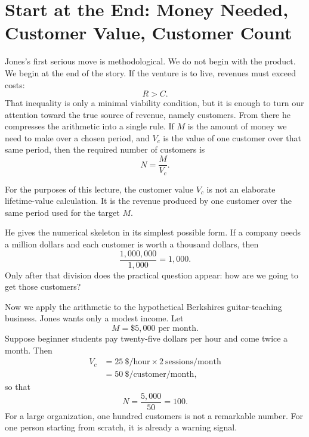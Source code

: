 \section{Start at the End: Money Needed, Customer Value, Customer Count}

Jones's first serious move is methodological. We do not begin with the product. We begin at the end of the story. If the venture is to live, revenues must exceed costs:
\begin{equation}
R>C.
\end{equation}
That inequality is only a minimal viability condition, but it is enough to turn our attention toward the true source of revenue, namely customers. From there he compresses the arithmetic into a single rule. If \(M\) is the amount of money we need to make over a chosen period, and \(V_c\) is the value of one customer over that same period, then the required number of customers is
\begin{equation}
N=\frac{M}{V_c}.
\end{equation}

\begin{definition}
For the purposes of this lecture, the customer value \(V_c\) is not an elaborate lifetime-value calculation. It is the revenue produced by one customer over the same period used for the target \(M\).
\end{definition}

He gives the numerical skeleton in its simplest possible form. If a company needs a million dollars and each customer is worth a thousand dollars, then
\begin{equation}
\frac{1{,}000{,}000}{1{,}000}=1{,}000.
\end{equation}
Only after that division does the practical question appear: how are we going to get those customers?

Now we apply the arithmetic to the hypothetical Berkshires guitar-teaching business. Jones wants only a modest income. Let
\[
M=\$5{,}000 \text{ per month.}
\]
Suppose beginner students pay twenty-five dollars per hour and come twice a month. Then
\begin{align}
V_c &= 25\ \$/\text{hour}\times 2\ \text{sessions/month} \\
&= 50\ \$/\text{customer/month},
\end{align}
so that
\begin{equation}
N=\frac{5{,}000}{50}=100.
\end{equation}
For a large organization, one hundred customers is not a remarkable number. For one person starting from scratch, it is already a warning signal.

